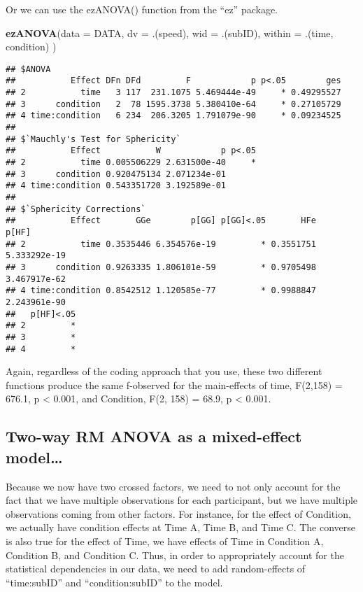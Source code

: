 \documentclass[]{article}
\newenvironment{Shaded}{\begin{snugshade}}{\end{snugshade}}
\newcommand{\DataTypeTok}[1]{\textcolor[rgb]{0.13,0.29,0.53}{#1}}
\newcommand{\KeywordTok}[1]{\textcolor[rgb]{0.13,0.29,0.53}{\textbf{#1}}}
\newcommand{\NormalTok}[1]{#1}
\begin{document}
Or we can use the ezANOVA() function from the ``ez'' package.

\begin{Shaded}
\begin{Highlighting}[]
\KeywordTok{ezANOVA}\NormalTok{(}\DataTypeTok{data =}\NormalTok{ DATA, }
    \DataTypeTok{dv =}\NormalTok{ .(speed),}
    \DataTypeTok{wid =}\NormalTok{ .(subID),}
    \DataTypeTok{within =}\NormalTok{ .(time, condition)}
\NormalTok{)}
\end{Highlighting}
\end{Shaded}

\begin{verbatim}
## $ANOVA
##           Effect DFn DFd         F            p p<.05        ges
## 2           time   3 117  231.1075 5.469444e-49     * 0.49295527
## 3      condition   2  78 1595.3738 5.380410e-64     * 0.27105729
## 4 time:condition   6 234  206.3205 1.791079e-90     * 0.09234525
## 
## $`Mauchly's Test for Sphericity`
##           Effect           W            p p<.05
## 2           time 0.005506229 2.631500e-40     *
## 3      condition 0.920475134 2.071234e-01      
## 4 time:condition 0.543351720 3.192589e-01      
## 
## $`Sphericity Corrections`
##           Effect       GGe        p[GG] p[GG]<.05       HFe        p[HF]
## 2           time 0.3535446 6.354576e-19         * 0.3551751 5.333292e-19
## 3      condition 0.9263335 1.806101e-59         * 0.9705498 3.467917e-62
## 4 time:condition 0.8542512 1.120585e-77         * 0.9988847 2.243961e-90
##   p[HF]<.05
## 2         *
## 3         *
## 4         *
\end{verbatim}

Again, regardless of the coding approach that you use, these two
different functions produce the same f-observed for the main-effects of
time, F(2,158) = 676.1, p \textless{} 0.001, and Condition, F(2, 158) =
68.9, p \textless{} 0.001.

\hypertarget{two-way-rm-anova-as-a-mixed-effect-model}{%
\subsection{Two-way RM ANOVA as a mixed-effect
model\ldots{}}\label{two-way-rm-anova-as-a-mixed-effect-model}}

Because we now have two crossed factors, we need to not only account for
the fact that we have multiple observations for each participant, but we
have multiple observations coming from other factors. For instance, for
the effect of Condition, we actually have condition effects at Time A,
Time B, and Time C. The converse is also true for the effect of Time, we
have effects of Time in Condition A, Condition B, and Condition C. Thus,
in order to appropriately account for the statistical dependencies in
our data, we need to add random-effects of ``time:subID'' and
``condition:subID'' to the model.
\end{document}
